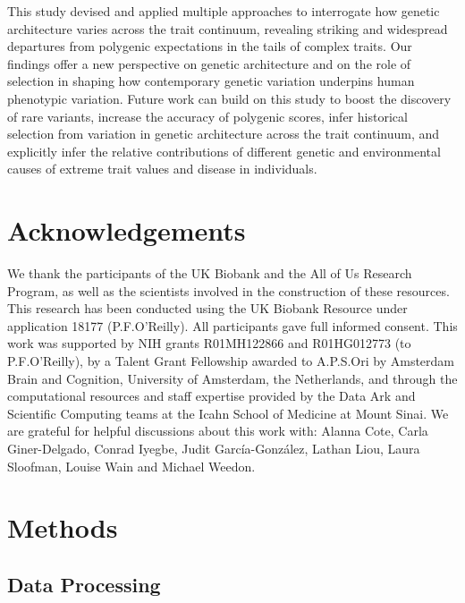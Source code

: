 \documentclass[12pt]{zHenriquesLab-StyleBioRxiv}
\begin{document}
{{This study devised and applied multiple approaches to interrogate how genetic architecture 
varies across the trait continuum, revealing striking and widespread departures from polygenic 
expectations in the tails of complex traits. Our findings offer a new perspective on 
genetic architecture and on the role of selection in shaping how contemporary genetic 
variation underpins human phenotypic variation. Future work can build on this study to boost 
the discovery of rare variants, increase the accuracy of polygenic scores, infer historical 
selection from variation in genetic architecture across the trait continuum, 
and explicitly infer the relative contributions of different genetic and environmental 
causes of extreme trait values and disease in individuals.
%
%
%
%
%
%
%
%
%
%
%
%
%
%
%
%
%
%
%
%
%
%
%
%
%
%
%
%
%
%
%
%
%
%
%
%
%
%
%
%
%
%
%
%
\section*{Acknowledgements}
We thank the participants of the UK Biobank and the All of Us Research Program, as well as the scientists involved in
the construction of these resources. This research has been conducted using
the UK Biobank Resource under application 18177 (P.F.O’Reilly). All participants gave full informed consent. This work was supported by NIH grants R01MH122866 and R01HG012773 (to P.F.O'Reilly), by a Talent Grant Fellowship awarded to A.P.S.Ori by Amsterdam Brain and Cognition, University of Amsterdam, the Netherlands, and through the computational resources and staff expertise provided by the Data Ark and Scientific Computing teams at the Icahn School of Medicine at Mount Sinai. We are grateful for helpful discussions about this work with: Alanna Cote, Carla Giner-Delgado, Conrad Iyegbe, Judit García-González, Lathan Liou, Laura Sloofman, Louise Wain and Michael Weedon.


\clearpage \newpage 
\section*{Methods} \label{sec:methods} 
\subsection*{Data Processing} \label{sec:methods:dataProcessing}
}}
\end{document}
